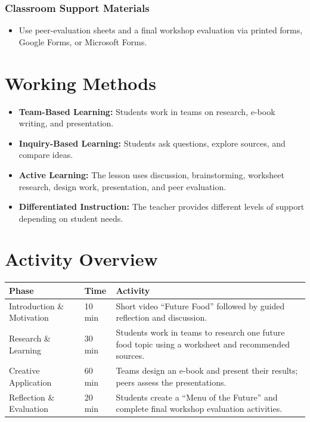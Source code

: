 \documentclass[11pt, a4paper]{article}
\begin{document}
\subsubsection*{Classroom Support Materials}
\begin{itemize}
    \item Use peer-evaluation sheets and a final workshop evaluation via printed forms, Google Forms, or Microsoft Forms.
\end{itemize}

\section{Working Methods}
\begin{itemize}
    \item \textbf{Team-Based Learning:} Students work in teams on research, e-book writing, and presentation.
    \item \textbf{Inquiry-Based Learning:} Students ask questions, explore sources, and compare ideas.
    \item \textbf{Active Learning:} The lesson uses discussion, brainstorming, worksheet research, design work, presentation, and peer evaluation.
    \item \textbf{Differentiated Instruction:} The teacher provides different levels of support depending on student needs.
\end{itemize}

\section*{Activity Overview}
\begingroup
\small
\begin{tabularx}{\textwidth}{|l|l|L|}
    \hline
     \textbf{Phase} & \textbf{Time} & \textbf{Activity} \\ \hline
    Introduction \& Motivation & 10 min & Short video ``Future Food'' followed by guided reflection and discussion. \\ \hline
    Research \& Learning & 30 min & Students work in teams to research one future food topic using a worksheet and recommended sources. \\ \hline
    Creative Application & 60 min & Teams design an e-book and present their results; peers assess the presentations. \\ \hline
    Reflection \& Evaluation & 20 min & Students create a ``Menu of the Future'' and complete final workshop evaluation activities. \\ \hline
\end{tabularx}
\endgroup
\end{document}
